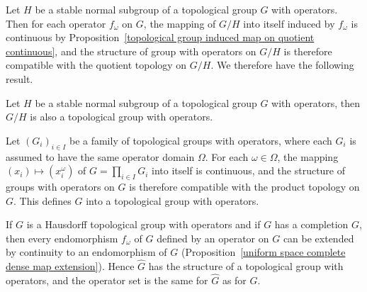 Let $H$ be a stable normal subgroup of a topological group $G$ with operators. Then for each operator $f_\omega$ on $G$, the mapping of $G/H$ into itself induced by $f_\omega$ is continuous by Proposition~\ref{topological group induced map on quotient continuous}, and the structure of group with operators on $G/H$ is therefore compatible with the quotient topology on $G/H$. We therefore have the following result.
\begin{proposition}
Let $H$ be a stable normal subgroup of a topological group $G$ with operators, then $G/H$ is also a topological group with operators.
\end{proposition}
Let $(G_i)_{i\in I}$ be a family of topological groups with operators, where each $G_i$ is assumed to have the same operator domain $\Omega$. For each $\omega\in\Omega$, the mapping $(x_i)\mapsto(x_i^\omega)$ of $G=\prod_{i\in I}G_i$ into itself is continuous, and the structure of groups with operators on $G$ is therefore compatible with the product topology on $G$. This defines $G$ into a topological group with operators.\par
If $G$ is a Hausdorff topological group with operators and if $G$ has a completion $G$, then every endomorphism $f_\omega$ of $G$ defined by an operator on $G$ can be extended by continuity to an endomorphism of $G$ (Proposition~\ref{uniform space complete dense map extension}). Hence $\widehat{G}$ has the structure of a topological group with operators, and the operator set is the same for $\widehat{G}$ as for $G$.
